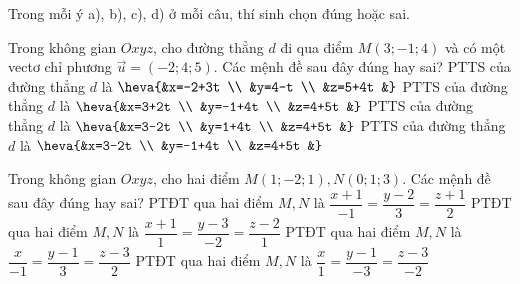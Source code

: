 \TNTF
Trong mỗi ý a), b), c), d) ở mỗi câu, thí sinh chọn đúng hoặc sai.
\begin{ex}%
	Trong không gian $Oxyz$, cho đường thẳng $d$ đi qua điểm $M(3;-1; 4)$ và có một vectơ  chỉ phương $\overrightarrow{u}=(-2; 4; 5)$. Các mệnh đề sau đây đúng hay sai?
	\choiceTF
	{PTTS của đường thẳng $d$ là $\heva{&x=-2+3t \\
			&y=4-t \\
			&z=5+4t
			&}$}
	{PTTS của đường thẳng $d$ là $\heva{&x=3+2t \\
			&y=-1+4t \\
			&z=4+5t
			&}$}
	{PTTS của đường thẳng $d$ là $\heva{&x=3-2t \\
			&y=1+4t \\
			&z=4+5t
			&}$}
	{\True PTTS của đường thẳng $d$ là $\heva{&x=3-2t \\
			&y=-1+4t \\
			&z=4+5t
			&}$}
\end{ex}
\begin{ex}%
	Trong không gian $Oxyz$, cho hai điểm $M(1;-2; 1), N(0; 1; 3)$. Các mệnh đề sau đây đúng hay sai?
	\choiceTF
	{PTĐT qua hai điểm $M, N$ là $\dfrac{x+1}{-1}=\dfrac{y-2}{3}=\dfrac{z+1}{2}$}
	{PTĐT qua hai điểm $M, N$ là $\dfrac{x+1}{1}=\dfrac{y-3}{-2}=\dfrac{z-2}{1}$}
	{\True PTĐT qua hai điểm $M, N$ là $\dfrac{x}{-1}=\dfrac{y-1}{3}=\dfrac{z-3}{2}$}
	{\True PTĐT qua hai điểm $M, N$ là $\dfrac{x}{1}=\dfrac{y-1}{-3}=\dfrac{z-3}{-2}$}
\end{ex}
